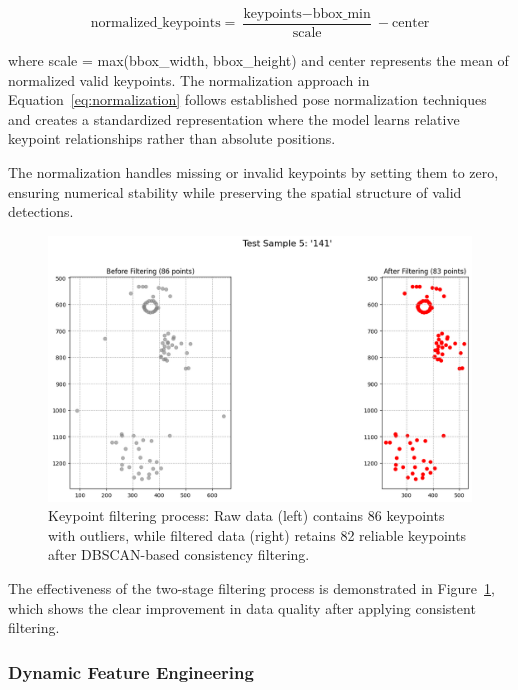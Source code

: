 \begin{equation}
\text{normalized\_keypoints} = \frac{\text{keypoints} - \text{bbox\_min}}{\text{scale}} - \text{center}
\label{eq:normalization}
\end{equation}

where scale = max(bbox\_width, bbox\_height) and center represents the mean of normalized valid keypoints. The normalization approach in Equation~\ref{eq:normalization} follows established pose normalization techniques \cite{thoker2021skeleton} and creates a standardized representation where the model learns relative keypoint relationships rather than absolute positions.

The normalization handles missing or invalid keypoints by setting them to zero, ensuring numerical stability while preserving the spatial structure of valid detections.

\begin{figure}
    \centering
    \includegraphics[width=1\linewidth]{460159971-10233a12-a7e4-450b-b069-51fd92ace2fd.png}
    \caption{Keypoint filtering process: Raw data (left) contains 86 keypoints with outliers, while filtered data (right) retains 82 reliable keypoints after DBSCAN-based consistency filtering.}
    \label{fig:outlier_filtering}
\end{figure}

The effectiveness of the two-stage filtering process is demonstrated in Figure~\ref{fig:outlier_filtering}, which shows the clear improvement in data quality after applying consistent filtering.

\subsubsection{Dynamic Feature Engineering}

